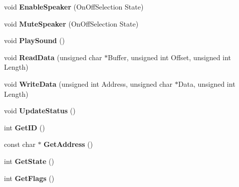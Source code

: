 \begin{DoxyCompactItemize}
\item 
\hypertarget{class_c_wiimote_af1a936c6f362670eea3663dd15219bd8}{void {\bfseries Enable\-Speaker} (On\-Off\-Selection State)}\label{class_c_wiimote_af1a936c6f362670eea3663dd15219bd8}

\item 
\hypertarget{class_c_wiimote_aab77d7cd365cea3a7d1e8bdbff07de38}{void {\bfseries Mute\-Speaker} (On\-Off\-Selection State)}\label{class_c_wiimote_aab77d7cd365cea3a7d1e8bdbff07de38}

\item 
\hypertarget{class_c_wiimote_a80afecda83601b7e3b33087500b05c84}{void {\bfseries Play\-Sound} ()}\label{class_c_wiimote_a80afecda83601b7e3b33087500b05c84}

\item 
\hypertarget{class_c_wiimote_a2894de3f305f27ec1f47d896659a8037}{void {\bfseries Read\-Data} (unsigned char $\ast$Buffer, unsigned int Offset, unsigned int Length)}\label{class_c_wiimote_a2894de3f305f27ec1f47d896659a8037}

\item 
\hypertarget{class_c_wiimote_a048e1a9f0612b58b6201ab0f88c7df6c}{void {\bfseries Write\-Data} (unsigned int Address, unsigned char $\ast$Data, unsigned int Length)}\label{class_c_wiimote_a048e1a9f0612b58b6201ab0f88c7df6c}

\item 
\hypertarget{class_c_wiimote_aa175e0730a9e68334c010119a280720d}{void {\bfseries Update\-Status} ()}\label{class_c_wiimote_aa175e0730a9e68334c010119a280720d}

\item 
\hypertarget{class_c_wiimote_aff65f1d90f0fd1a989f0566385276eeb}{int {\bfseries Get\-I\-D} ()}\label{class_c_wiimote_aff65f1d90f0fd1a989f0566385276eeb}

\item 
\hypertarget{class_c_wiimote_a0df092c0ad66746f24793a088ff46e6a}{const char $\ast$ {\bfseries Get\-Address} ()}\label{class_c_wiimote_a0df092c0ad66746f24793a088ff46e6a}

\item 
\hypertarget{class_c_wiimote_a0b4b626beab4475fa349de8943c7b24f}{int {\bfseries Get\-State} ()}\label{class_c_wiimote_a0b4b626beab4475fa349de8943c7b24f}

\item 
\hypertarget{class_c_wiimote_a2900db59b2eb728f9db885ec1c9aa5e4}{int {\bfseries Get\-Flags} ()}\label{class_c_wiimote_a2900db59b2eb728f9db885ec1c9aa5e4}


\end{DoxyCompactItemize}
